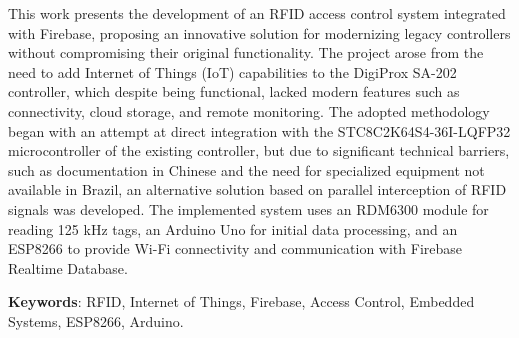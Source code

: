 %
%

This work presents the development of an RFID access control system integrated with Firebase, proposing an innovative solution for modernizing legacy controllers without compromising their original functionality. The project arose from the need to add Internet of Things (IoT) capabilities to the DigiProx SA-202 controller, which despite being functional, lacked modern features such as connectivity, cloud storage, and remote monitoring. The adopted methodology began with an attempt at direct integration with the STC8C2K64S4-36I-LQFP32 microcontroller of the existing controller, but due to significant technical barriers, such as documentation in Chinese and the need for specialized equipment not available in Brazil, an alternative solution based on parallel interception of RFID signals was developed. The implemented system uses an RDM6300 module for reading 125 kHz tags, an Arduino Uno for initial data processing, and an ESP8266 to provide Wi-Fi connectivity and communication with Firebase Realtime Database. 

\vspace{1.5ex}

{\bf Keywords}: RFID, Internet of Things, Firebase, Access Control, Embedded Systems, ESP8266, Arduino.
